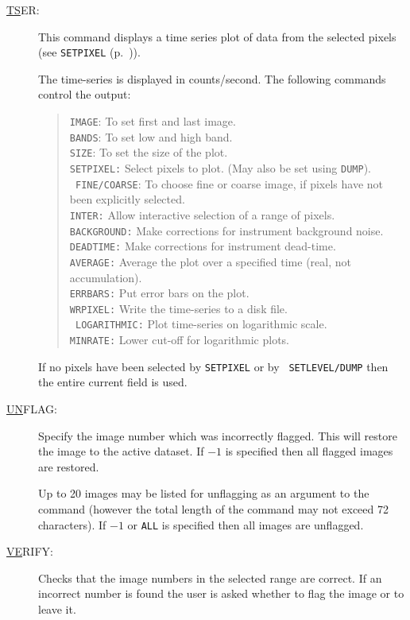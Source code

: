 \begin{description}
\item[\underline{TS}ER: ] \label{ts}
This command displays a time series plot of data from the selected
pixels (see {\tt SETPIXEL} (p.~\pageref{setp})).

The time-series is displayed in counts/second. The following commands
control the output:
\begin{quote}
{\tt IMAGE}: To set first and last image.\\ {\tt BANDS}: To set low and
high band.\\ {\tt SIZE}: To set the size of the plot.\\ {\tt SETPIXEL:}
Select pixels to plot. (May also be set using {\tt DUMP}).\\ {\tt
FINE/COARSE}: To choose fine or coarse image, if pixels have not been
explicitly selected.\\ {\tt INTER:} Allow interactive selection of a
range of pixels.\\ {\tt BACKGROUND:} Make corrections for instrument
background noise.\\ {\tt DEADTIME:} Make corrections for instrument
dead-time.\\ {\tt AVERAGE:} Average the plot over a specified time
(real, not accumulation).\\ {\tt ERRBARS:} Put error bars on the
plot.\\ {\tt WRPIXEL:} Write the time-series to a disk file.\\ {\tt
LOGARITHMIC:} Plot time-series on logarithmic scale.\\ {\tt MINRATE:}
Lower cut-off for logarithmic plots.
\end{quote}

If no pixels have been selected by {\tt SETPIXEL} or by {\tt
SETLEVEL/DUMP} then the entire current field is used.

\item[\underline{UN}FLAG: ] \label{un}
Specify the image number which was incorrectly flagged. This will
restore the image to the active dataset. If $-1$ is specified then all
flagged images are restored.

Up to 20 images may be listed for unflagging as an argument to the
command (however the total length of the command may not exceed 72
characters).  If $-1$ or {\tt ALL} is specified then all images are
unflagged.

\item[\underline{VE}RIFY: ] \label{ve}
Checks that the image numbers in the selected range are correct.  If an
incorrect number is found the user is asked whether to flag the image
or to leave it.


\end{description}
